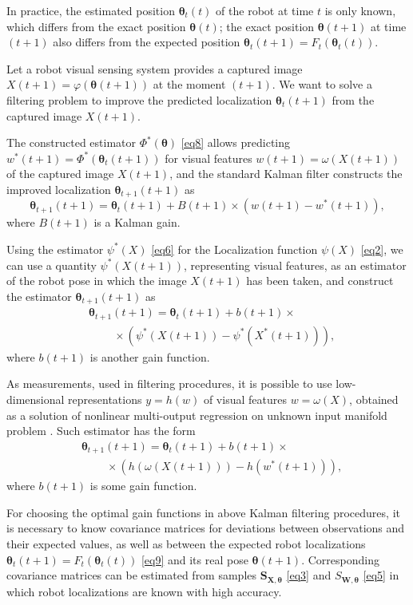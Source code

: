 \documentclass[conference]{IEEEtran} %
\def\mbtheta{{\bm\theta}}
\def\mbS{\mathbf{S}}
\begin{document}
In practice, the estimated position $\mbtheta_t(t)$ of the robot at time $t$ is only known, which differs from the exact position $\mbtheta(t)$; the exact position $\mbtheta(t+1)$ at time $(t+1)$ also differs from the expected position $\mbtheta_t(t+1) = F_t(\mbtheta_t(t))$.

Let a robot visual sensing system provides a captured image $X(t+1) = \varphi(\mbtheta(t+1))$ at the moment $(t+1)$. We want to solve a filtering problem to improve the predicted localization $\mbtheta_t(t+1)$ from the captured image $X(t+1)$.

The constructed estimator $\Phi^*(\mbtheta)$ \eqref{eq8} allows predicting $w^*(t+1) = \Phi^*(\mbtheta_t(t+1))$ for visual features $w(t+1) = \omega(X(t+1))$ of the captured image $X(t+1)$, and the standard Kalman filter \cite{bib5} constructs the improved localization $\mbtheta_{t+1}(t+1)$ as
\begin{equation*}
	\mbtheta_{t+1}(t+1) = \mbtheta_t(t+1) + B(t+1)\times(w(t+1) - w^*(t+1)),
\end{equation*}    
where $B(t+1)$ is a Kalman gain.

Using the estimator $\psi^*(X)$ \eqref{eq6} for the Localization function $\psi(X)$ \eqref{eq2}, we can use a quantity $\psi^*(X(t+1))$, representing visual features, as an estimator of the robot pose in which the image $X(t+1)$ has been taken, and construct the estimator $\mbtheta_{t+1}(t+1)$ as
\begin{eqnarray*}
	&\mbtheta_{t+1}(t+1) = \mbtheta_t(t+1) + b(t+1)\times \\ & \;\;\;\;\;\;\;\;
    \times(\psi^*(X(t+1)) - \psi^*(X^*(t+1))),
\end{eqnarray*} 
where $b(t+1)$ is another gain function.

As measurements, used in filtering procedures, it is possible to use low-dimensional representations $y = h(w)$ of visual features $w = \omega(X)$, obtained as a solution of nonlinear multi-output regression on unknown input manifold problem \cite{bib20}. Such estimator has the form 
\begin{eqnarray*}
	& \mbtheta_{t+1}(t+1) = \mbtheta_t(t+1) + b(t+1)\times\\ 
     & \;\;\;\;\;\;\;\; \times(h(\omega(X(t+1))) - h(w^*(t+1))),
\end{eqnarray*}    
where $b(t+1)$ is some gain function.  

For choosing the optimal gain functions in above Kalman filtering procedures, it is necessary to know covariance matrices for deviations between observations and their expected values, as well as between the expected robot localizations $\mbtheta_t(t+1) = F_t(\mbtheta_t(t))$ \eqref{eq9} and its real pose $\mbtheta(t+1)$. Corresponding covariance matrices can be estimated from samples $\mbS_{\mathbf{X},\mbtheta}$ \eqref{eq3} and $S_{\mathbf{W},\mbtheta}$ \eqref{eq5} in which robot localizations are known with high accuracy.
\end{document}
